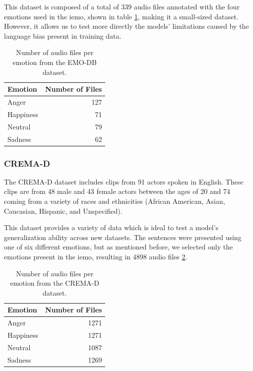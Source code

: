 This dataset is composed of a total of 339 audio files annotated with the four emotions used in the \ac{iemo}, shown in table \ref{tab:emo_files}, making it a small-sized dataset. However, it allows us to test more directly the models' limitations caused by the language bias present in training data. 

\begin{table}[H]
	\centering
	\caption{Number of audio files per emotion from the EMO-DB dataset.}
	\label{tab:emo_files}
	\begin{tabular}{lr}
		\toprule
		Emotion     &   Number of Files \\
		\midrule
		Anger   	&               127 \\
		Happiness   &                71 \\
		Neutral		&                79 \\
		Sadness     &                62 \\
		\bottomrule
	\end{tabular}
\end{table}


\subsubsection{CREMA-D}


The CREMA-D dataset includes clips from 91 actors spoken in English. These clips are from 48 male and 43 female actors between the ages of 20 and 74 coming from a variety of races and ethnicities (African American, Asian, Caucasian, Hispanic, and Unspecified).

This dataset provides a variety of data which is ideal to test a model's generalization ability across new datasets. The sentences were presented using one of six different emotions, but as mentioned before, we selected only the emotions present in the \ac{iemo}, resulting in 4898 audio files \ref{tab:crema_files}. 

\begin{table}[H]
	\centering
	\caption{Number of audio files per emotion from the CREMA-D dataset.}
	\label{tab:crema_files}
	\begin{tabular}{lr}
		\toprule
		Emotion     &   Number of Files \\
		\midrule
		Anger   	&              1271 \\
		Happiness   &              1271 \\
		Neutral 	&              1087 \\
		Sadness     &              1269 \\
		\bottomrule
	\end{tabular}
\end{table}


